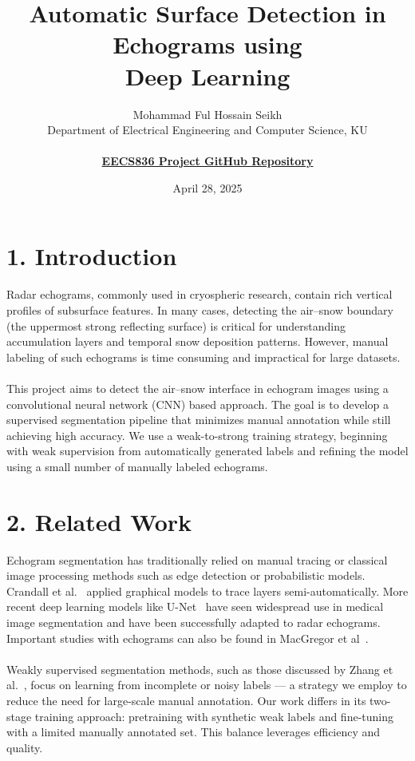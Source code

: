 \documentclass[11pt,oneside,openany]{article}
\title{\textbf{Automatic Surface Detection in Echograms using\\ Deep Learning}}
\author{Mohammad Ful Hossain Seikh\\
Department of Electrical Engineering and Computer Science, KU\\\\
\href{https://github.com/Mohammad-Neutrino/EECS836_Machine_Learning/tree/trunk/Project}{\textbf{EECS836 Project GitHub Repository}}}
\date{April 28, 2025}
\begin{document}
\maketitle

\section*{1. Introduction}
Radar echograms, commonly used in cryospheric research, contain rich vertical profiles of subsurface features. In many cases, detecting the air–snow boundary (the uppermost strong reflecting surface) is critical for understanding accumulation layers and temporal snow deposition patterns. However, manual labeling of such echograms is time consuming and impractical for large datasets.\\\\
This project aims to detect the air–snow interface in echogram images using a convolutional neural network (CNN) based approach. The goal is to develop a supervised segmentation pipeline that minimizes manual annotation while still achieving high accuracy. We use a weak-to-strong training strategy, beginning with weak supervision from automatically generated labels and refining the model using a small number of manually labeled echograms.

\section*{2. Related Work}
Echogram segmentation has traditionally relied on manual tracing or classical image processing methods such as edge detection or probabilistic models. Crandall et al.~\cite{2} applied graphical models to trace layers semi-automatically. More recent deep learning models like U-Net~\cite{1} have seen widespread use in medical image segmentation and have been successfully adapted to radar echograms. Important studies with echograms can also be found in MacGregor et al~\cite{4}.\\\\
Weakly supervised segmentation methods, such as those discussed by Zhang et al.~\cite{3}, focus on learning from incomplete or noisy labels — a strategy we employ to reduce the need for large-scale manual annotation. Our work differs in its two-stage training approach: pretraining with synthetic weak labels and fine-tuning with a limited manually annotated set. This balance leverages efficiency and quality.
\end{document}
